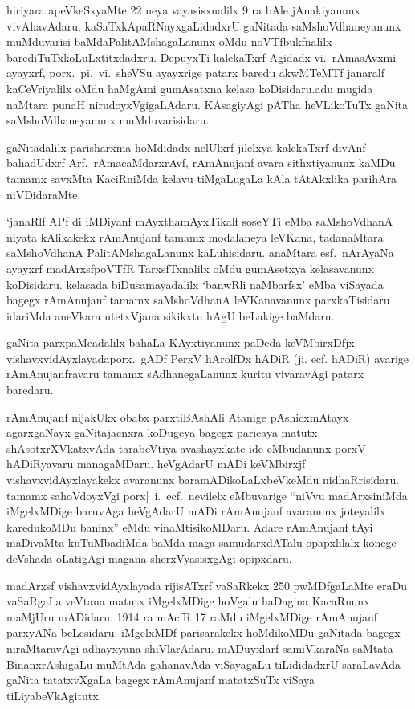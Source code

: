 hiriyara apeVkeSxyaMte {\rm 22} neya vayasisxnalilx {\rm 9} ra bAle jAnakiyanunx vivAha\-vAdaru. kaSaTxkApaRNayxgaLidadxrU gaNitada saMshoVdhaneyanunx muMduvarisi baMda\break PalitAMshagaLanunx oMdu noVTfbukfnalilx  barediTuTxkoLuLxtitxdadxru. DepuyxTi kalekaTxrf Agidadx vi.~rAmasAvxmi ayayxrf, porx.~pi.~vi.~sheVSu ayayxrige patarx baredu akwMTeMTf janaralf kaCeVriyalilx oMdu haMgAmi gumAsatxna kelasa koDisidaru.\break adu mugida naMtara punaH nirudoyxVgigaLAdaru. KAsagiyAgi pATha heVLikoTuTx gaNita saMshoVdhaneyanunx muMduvarisidaru.

gaNitadalilx parisharxma hoMdidadx nelUlxrf jilelxya kalekaTxrf divAnf bahadUdxrf\break 
Arf.~rAmacaMdarxrAvf, rAmAnujanf avara sithxtiyanunx kaMDu tamamx savxMta KaciRniMda kelavu tiMgaLugaLa kAla tAtAkxlika parihAra niVDidaraMte.

`janaRlf APf di iMDiyanf mAyxthamAyxTikalf soseYTi eMba saMshoVdhanA niyata kAlikakekx rAmAnujanf tamamx modalaneya leVKana, tadanaMtara saMshoVdhanA PalitAMshagaLanunx kaLuhisidaru. anaMtara esf.~nArAyaNa ayayxrf madArxsf\break poVTfR TarxsfTxnalilx oMdu gumAsetxya kelasavanunx koDisidaru. kelasada biDusamaya\-dalilx `banwRli naMbarfsx' eMba viSayada bagegx rAmAnujanf tamamx saMshoVdhanA leVKanavanunx parxkaTisidaru idariMda aneVkara utetxVjana sikikxtu hAgU beLakige baMdaru.

gaNita parxpaMcadalilx bahaLa KAyxtiyanunx paDeda keVMbirxDfjx vishavxvidAyxlayada\break porx.~gADf PerxV hArolfDx hADiR (ji. ecf. hADiR) avarige rAmAnujanfravaru tamamx sAdhanegaLanunx kuritu vivaravAgi patarx baredaru.

rAmAnujanf nijakUkx obabx parxtiBAshAli Atanige pAshicxmAtayx agarxgaNayx gaNitajacnxra koDugeya bagegx paricaya matutx shAsotxrXVkatxvAda tarabeVtiya avashayxkate ide eMbu\-danunx porxV hADiRyavaru managaMDaru. heVgAdarU mADi keVMbirxjf vishavxvidAyxlayakekx avaranunx baramADikoLaLxbeVkeMdu nidhaRrisidaru. tamamx sahoVdoyxVgi porx|~i.~ecf.~nevilelx eMbuvarige ``niVvu madArxsiniMda iMgelxMDige baruvAga heVgAdarU mADi rAmA\-nujanf avaranunx joteyalilx karedukoMDu baninx'' eMdu vinaMtisikoMDaru. Adare rAmAnujanf tAyi maDivaMta kuTuMba\-diMda baMda maga samudarxdATalu opapxlilalx konege deVshada oLatigAgi magana sherxVyasisxgAgi opipxdaru.

madArxsf vishavxvidAyxlayada rijisATxrf vaSaRkekx {\rm 250} pwMDfgaLaMte eraDu vaSaRgaLa veVtana matutx iMgelxMDige hoVgalu haDagina KacaRnunx maMjUru mADidaru.  {\rm 1914} ra mAcfR {\rm 17} raMdu iMgelxMDige rAmAnujanf parxyANa beLesidaru. iMgelxMDf parisarakekx hoMdikoMDu gaNitada bagegx niraMtaravAgi adhayxyana shiVlarAdaru. mADuyx\-larf samiVkaraNa saMtata BinanxrAshigaLu muMtAda gahanavAda viSayagaLu tiLididadxrU saraLavAda gaNita tatatxvXgaLa bagegx rAmAnujanf matatxSuTx viSaya tiLiyabeVkAgitutx.

